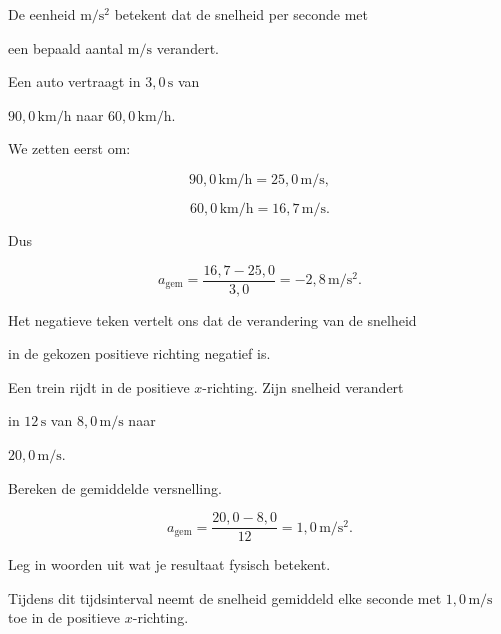 \documentclass{ximera}
\begin{document}
De eenheid $\mathrm{m/s^2}$ betekent dat de snelheid per seconde met

een bepaald aantal $\mathrm{m/s}$ verandert.

\begin{voorbeeld}[Remmen]

Een auto vertraagt in $3,0\,\mathrm{s}$ van

$90,0\,\mathrm{km/h}$ naar $60,0\,\mathrm{km/h}$.

We zetten eerst om:

\[90,0\,\mathrm{km/h}=25,0\,\mathrm{m/s},\]

\[60,0\,\mathrm{km/h}=16,7\,\mathrm{m/s}.\]

Dus

\[a_{\mathrm{gem}} = \frac{16,7-25,0}{3,0} = -2,8\,\mathrm{m/s^2}.\]

Het negatieve teken vertelt ons dat de verandering van de snelheid

in de gekozen positieve richting negatief is.

\end{voorbeeld}

\begin{oefening}{\oefB\ESS}

Een trein rijdt in de positieve $x$-richting. Zijn snelheid verandert

in $12\,\mathrm{s}$ van $8,0\,\mathrm{m/s}$ naar

$20,0\,\mathrm{m/s}$.

\begin{question}

Bereken de gemiddelde versnelling.

\begin{oplossing}
\[a_{\mathrm{gem}}=\frac{20,0-8,0}{12}=1,0\,\mathrm{m/s^2}.\]
\end{oplossing}

\end{question}

\begin{question}

Leg in woorden uit wat je resultaat fysisch betekent.

\begin{oplossing}
Tijdens dit tijdsinterval neemt de snelheid gemiddeld elke seconde met \(1,0\,\mathrm{m/s}\) toe in de positieve \(x\)-richting.
\end{oplossing}

\end{question}

\end{oefening}
\end{document}
